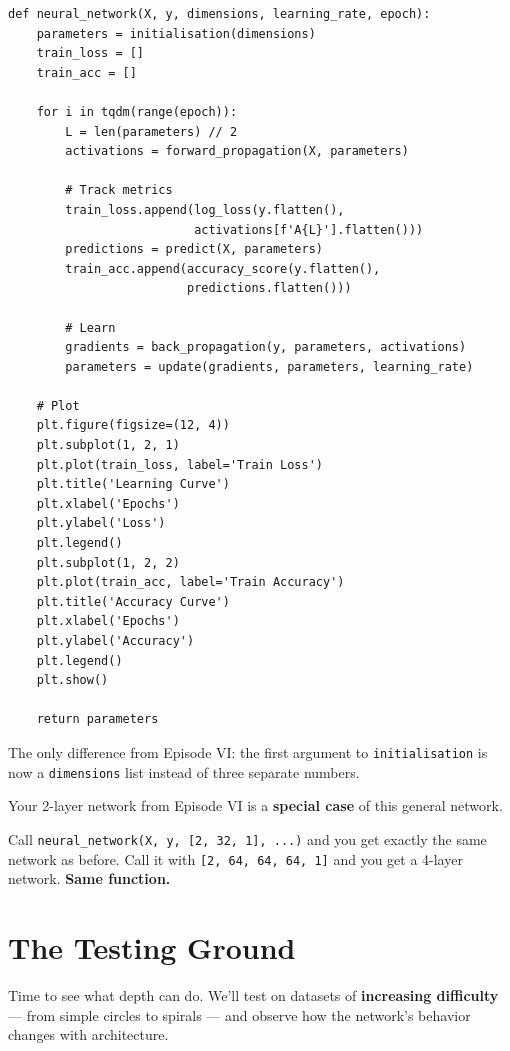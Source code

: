 \documentclass[11pt]{article}
\begin{document}
\begin{lstlisting}
def neural_network(X, y, dimensions, learning_rate, epoch):
    parameters = initialisation(dimensions)
    train_loss = []
    train_acc = []

    for i in tqdm(range(epoch)):
        L = len(parameters) // 2
        activations = forward_propagation(X, parameters)

        # Track metrics
        train_loss.append(log_loss(y.flatten(),
                          activations[f'A{L}'].flatten()))
        predictions = predict(X, parameters)
        train_acc.append(accuracy_score(y.flatten(),
                         predictions.flatten()))

        # Learn
        gradients = back_propagation(y, parameters, activations)
        parameters = update(gradients, parameters, learning_rate)

    # Plot
    plt.figure(figsize=(12, 4))
    plt.subplot(1, 2, 1)
    plt.plot(train_loss, label='Train Loss')
    plt.title('Learning Curve')
    plt.xlabel('Epochs')
    plt.ylabel('Loss')
    plt.legend()
    plt.subplot(1, 2, 2)
    plt.plot(train_acc, label='Train Accuracy')
    plt.title('Accuracy Curve')
    plt.xlabel('Epochs')
    plt.ylabel('Accuracy')
    plt.legend()
    plt.show()

    return parameters
\end{lstlisting}

The only difference from Episode VI: the first argument to \texttt{initialisation} is now a \texttt{dimensions} list instead of three separate numbers.

\begin{insightbox}[title={Same Structure, Infinite Power}]
Your 2-layer network from Episode VI is a \textbf{special case} of this general network.

Call \texttt{neural\_network(X, y, [2, 32, 1], ...)} and you get exactly the same network as before. Call it with \texttt{[2, 64, 64, 64, 1]} and you get a 4-layer network. \textbf{Same function.}
\end{insightbox}


\section{The Testing Ground}

Time to see what depth can do. We'll test on datasets of \textbf{increasing difficulty} --- from simple circles to spirals --- and observe how the network's behavior changes with architecture.
\end{document}
